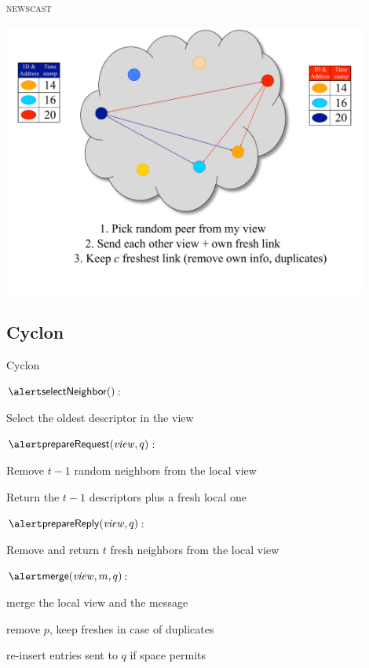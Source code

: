 \begin{frame}{\textsc{newscast}}
\begin{overprint}
\includegraphics[width=0.9\textwidth]{figs/11/10_newscast}
\end{overprint}
\end{frame}

\subsection{Cyclon}

\begin{frame}{Cyclon}
	
\BI
\item $\SelectNeighbor()$:
\BI
\item Select the oldest descriptor in the view
\EI
\item $\ExtractRequest(\View, q)$:
\BI
  \item Remove $t-1$ random neighbors from the local view
  \item Return the $t-1$ descriptors plus a fresh local one
\EI
\item $\ExtractReply(\View, q)$:
  \BI
  \item Remove and return $t$ fresh neighbors from the local view
  \EI
\item $\Merge(\View, m, q)$:
\BI
\item merge the local view and the message
\item remove $p$, keep freshes in case of duplicates
\item re-insert entries sent to $q$ if space permits
\EI
\EI
	
\begin{Bib}
\end{Bib}	
	
\end{frame}


